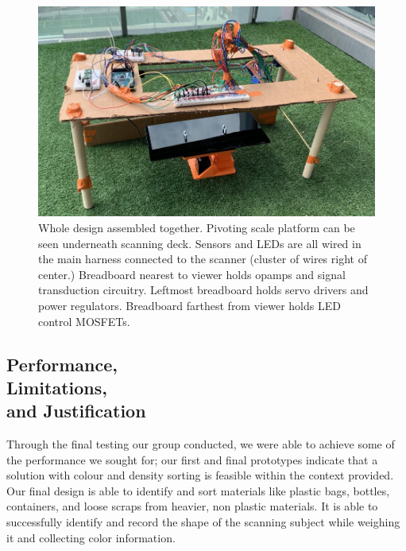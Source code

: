 \documentclass[12pt]{article}
\begin{document}
\begin{multicols*}{2}
            \begin{figure}[H]
                \centering\includegraphics[width=\linewidth]{WholeDesignGrass.png}
                \captionsetup{width=\linewidth}
                \caption{Whole design assembled together. Pivoting scale platform can be seen underneath scanning deck. Sensors and LEDs are all wired in the main harness connected to the scanner (cluster of wires right of center.) Breadboard nearest to viewer holds opamps and signal transduction circuitry. Leftmost breadboard holds servo drivers and power regulators. Breadboard farthest from viewer holds LED control MOSFETs.}
            \end{figure}

        
            

        \subsection{Performance, \\Limitations, \\and Justification} \label{subsec:PerformanceLimitationsJustification}

            Through the final testing our group conducted, we were able to achieve some of the performance we sought for; our first and final prototypes indicate that a solution with colour and density sorting is feasible within the context provided. Our final design is able to identify and sort materials like plastic bags, bottles, containers, and loose scraps from heavier, non plastic materials. It is able to successfully identify and record the shape of the scanning subject while weighing it and collecting color information. 
            

\end{multicols*}
\end{document}
